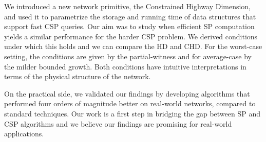 We introduced a new network primitive, the Constrained Highway Dimension, and used it to parametrize the storage and running time of data structures that support fast CSP queries.
Our aim was to study when efficient SP computation yields a similar performance for the harder CSP problem.
We derived conditions under which this holds and we can compare the HD and CHD.
For the worst-case setting, the conditions are given by the partial-witness and for average-case by the milder bounded growth. 
Both conditions have intuitive interpretations in terms of the physical structure of the network. 

On the practical side, we validated our findings by developing algorithms that performed four orders of magnitude better on real-world networks, compared to standard techniques.
Our work is a first step in bridging the gap between SP and CSP algorithms and we believe our findings are promising for real-world applications.